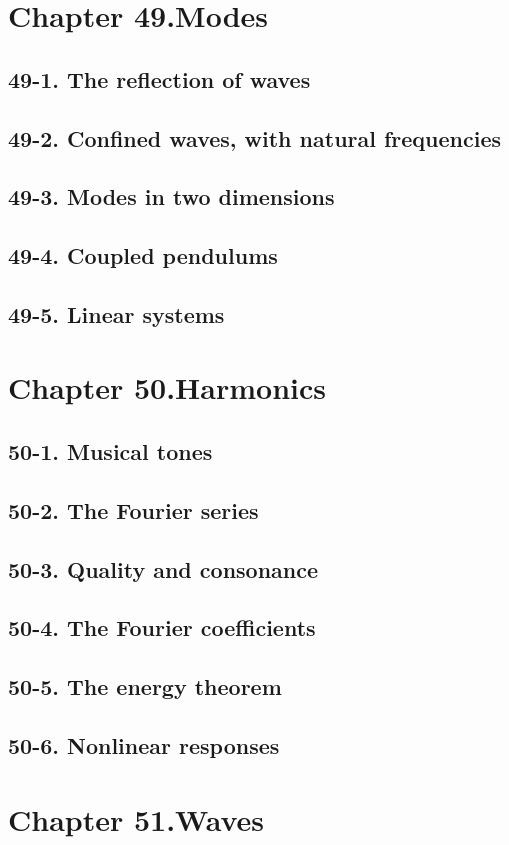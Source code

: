 \documentclass{article}
\begin{document}
\section{Chapter 49.Modes}
\subsection{49-1. The reflection of waves}
\subsection{49-2. Confined waves, with natural frequencies}
\subsection{49-3. Modes in two dimensions}
\subsection{49-4. Coupled pendulums}
\subsection{49-5. Linear systems}
\section{Chapter 50.Harmonics}
\subsection{50-1. Musical tones}
\subsection{50-2. The Fourier series}
\subsection{50-3. Quality and consonance}
\subsection{50-4. The Fourier coefficients}
\subsection{50-5. The energy theorem}
\subsection{50-6. Nonlinear responses}
\section{Chapter 51.Waves}
\end{document}
